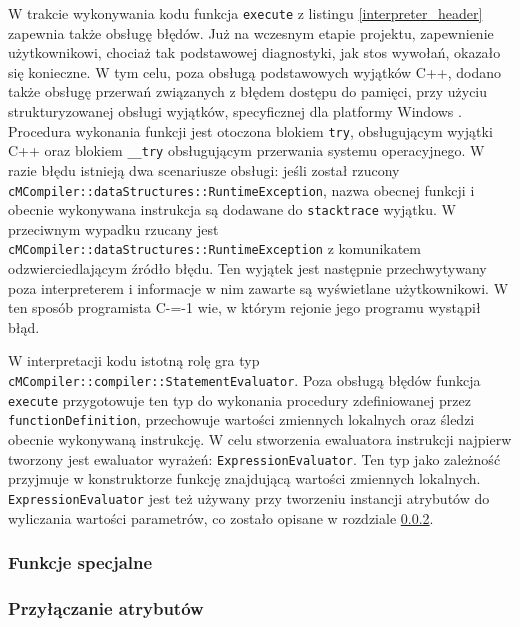 W trakcie wykonywania kodu funkcja \lstinline{execute} z listingu \ref{interpreter_header} zapewnia także obsługę błędów.
Już na wczesnym etapie projektu, zapewnienie użytkownikowi, chociaż tak podstawowej diagnostyki, jak stos wywołań, okazało się konieczne.
W tym celu, poza obsługą podstawowych wyjątków C++, dodano także obsługę przerwań związanych z błędem dostępu do pamięci, przy użyciu strukturyzowanej obsługi wyjątków, specyficznej dla platformy Windows \cite{structured_exception_handling, structured_exception_handling:microsoft}.
Procedura wykonania funkcji jest otoczona blokiem \lstinline{try}, obsługującym wyjątki C++ oraz blokiem \lstinline{__try} obsługującym przerwania systemu operacyjnego.
W razie błędu istnieją dwa scenariusze obsługi: jeśli został rzucony \lstinline{cMCompiler::dataStructures::RuntimeException}, nazwa obecnej funkcji i obecnie wykonywana instrukcja są dodawane do \lstinline{stacktrace} wyjątku.
W przeciwnym wypadku rzucany jest \lstinline{cMCompiler::dataStructures::RuntimeException} z komunikatem odzwierciedlającym źródło błędu.
Ten wyjątek jest następnie przechwytywany poza interpreterem i informacje w nim zawarte są wyświetlane użytkownikowi.
W ten sposób programista C-=-1 wie, w którym rejonie jego programu wystąpił błąd.

W interpretacji kodu istotną rolę gra typ \lstinline{cMCompiler::compiler::StatementEvaluator}.
Poza obsługą błędów funkcja \lstinline{execute} przygotowuje ten typ do wykonania procedury zdefiniowanej przez \lstinline{functionDefinition}, przechowuje wartości zmiennych lokalnych oraz śledzi obecnie wykonywaną instrukcję.
W celu stworzenia ewaluatora instrukcji najpierw tworzony jest ewaluator wyrażeń: \lstinline{ExpressionEvaluator}.
Ten typ jako zależność przyjmuje w konstruktorze funkcję znajdującą wartości zmiennych lokalnych.
\lstinline{ExpressionEvaluator} jest też używany przy tworzeniu instancji atrybutów do wyliczania wartości parametrów, co zostało opisane w rozdziale \ref{implementation:interpreter:attribute_attachment}.

\subsubsection{Funkcje specjalne}
\label{implementation:interpreter:special_functions}

\subsubsection{Przyłączanie atrybutów}
\label{implementation:interpreter:attribute_attachment}

